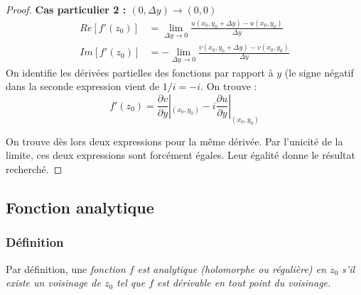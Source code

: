 \begin{proof}
    \textbf{Cas particulier 2 : $(0,\Delta y) \rightarrow (0,0)$}\\
    \begin{equation}
    \begin{array}{ll}
     Re[f'(z_0)] &= \lim\limits_{\Delta y\rightarrow 0} \frac{u(x_0, y_0+\Delta y) - u(x_0, y_0)}{\Delta y}\\
     Im[f'(z_0)] &= -\lim\limits_{\Delta y\rightarrow 0} \frac{v(x_0, y_0+\Delta y) - v(x_0, y_0)}{\Delta y}
    \end{array}
    \end{equation}
    On identifie les dérivées partielles des fonctions par rapport à $y$ (le signe négatif dans la seconde
    expression vient de $1/i = -i$. On trouve :
    \begin{equation}
    f'(z_0) = \frac{\partial v}{\partial y}|_{(x_0,y_0)} - i\frac{\partial u}{\partial y}|_{(x_0,y_0)}
    \end{equation}
    
    On trouve dès lors deux expressions pour la même dérivée. Par l'unicité de la limite, ces deux expressions
    sont forcément égales. Leur égalité donne le résultat recherché.
    \end{proof}
    
    
    
    \subsection{Fonction analytique}
        \subsubsection{Définition}
    Par définition, une \textit{fonction $f$ est analytique (holomorphe ou régulière) en $z_0$ s'il existe un
    voisinage de $z_0$ tel que $f$ est dérivable en tout point du voisinage.}\\
    \ \\
    
